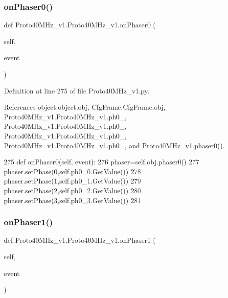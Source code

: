 \subsubsection{\texorpdfstring{on\+Phaser0()}{onPhaser0()}}
{\footnotesize\ttfamily def Proto40\+M\+Hz\+\_\+v1.\+Proto40\+M\+Hz\+\_\+v1.\+on\+Phaser0 (\begin{DoxyParamCaption}\item[{}]{self,  }\item[{}]{event }\end{DoxyParamCaption})}



Definition at line 275 of file Proto40\+M\+Hz\+\_\+v1.\+py.



References object.\+object.\+obj, Cfg\+Frame.\+Cfg\+Frame.\+obj, Proto40\+M\+Hz\+\_\+v1.\+Proto40\+M\+Hz\+\_\+v1.\+ph0\+\_, Proto40\+M\+Hz\+\_\+v1.\+Proto40\+M\+Hz\+\_\+v1.\+ph0\+\_, Proto40\+M\+Hz\+\_\+v1.\+Proto40\+M\+Hz\+\_\+v1.\+ph0\+\_, Proto40\+M\+Hz\+\_\+v1.\+Proto40\+M\+Hz\+\_\+v1.\+ph0\+\_, and Proto40\+M\+Hz\+\_\+v1.\+phaser0().


\begin{DoxyCode}
275     \textcolor{keyword}{def }onPhaser0(self, event):
276         phaser=self.obj.phaser0()
277         phaser.setPhase(0,self.ph0\_0.GetValue())
278         phaser.setPhase(1,self.ph0\_1.GetValue())
279         phaser.setPhase(2,self.ph0\_2.GetValue())
280         phaser.setPhase(3,self.ph0\_3.GetValue())
281 
\end{DoxyCode}
\mbox{\label{classProto40MHz__v1_1_1Proto40MHz__v1_a6ce4bff9a33098821c271c6126d38e87}} 
\subsubsection{\texorpdfstring{on\+Phaser1()}{onPhaser1()}}
{\footnotesize\ttfamily def Proto40\+M\+Hz\+\_\+v1.\+Proto40\+M\+Hz\+\_\+v1.\+on\+Phaser1 (\begin{DoxyParamCaption}\item[{}]{self,  }\item[{}]{event }\end{DoxyParamCaption})}



